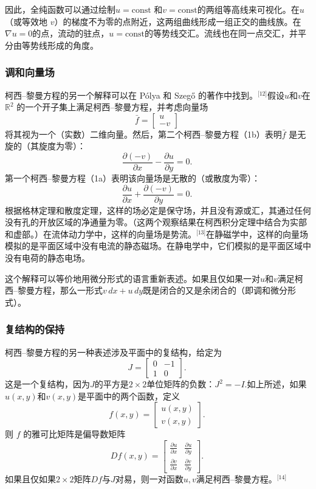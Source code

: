 因此，全纯函数可以通过绘制\( u = \text{const} \) 和\( v = \text{const} \)的两组等高线来可视化。在\( u \)（或等效地 \( v \)）的梯度不为零的点附近，这两组曲线形成一组正交的曲线族。在\( \nabla u = 0 \)的点，流动的驻点，\( u = \text{const} \)的等势线交汇。流线也在同一点交汇，并平分由等势线形成的角度。
\subsubsection{调和向量场}
柯西–黎曼方程的另一个解释可以在 Pólya 和 Szegő 的著作中找到。\(^\text{[12]}\)假设\( u \)和\( v \)在\(\mathbb{R}^2 \) 的一个开子集上满足柯西–黎曼方程，并考虑向量场  
\[
\bar{f} = \begin{bmatrix} u \\ -v \end{bmatrix}~
\]
将其视为一个（实数）二维向量。然后，第二个柯西–黎曼方程（1b）表明\( \bar{f} \) 是无旋的（其旋度为零）：  
\[
\frac{\partial (-v)}{\partial x} - \frac{\partial u}{\partial y} = 0.~
\]
第一个柯西–黎曼方程（1a）表明该向量场是无散的（或散度为零）：  
\[
\frac{\partial u}{\partial x} + \frac{\partial (-v)}{\partial y} = 0.~
\]
根据格林定理和散度定理，这样的场必定是保守场，并且没有源或汇，其通过任何没有孔的开放区域的净通量为零。（这两个观察结果在柯西积分定理中结合为实部和虚部。）在流体动力学中，这样的向量场是势流。\(^\text{[13]}\)在静磁学中，这样的向量场模拟的是平面区域中没有电流的静态磁场。在静电学中，它们模拟的是平面区域中没有电荷的静态电场。

这个解释可以等价地用微分形式的语言重新表述。如果且仅如果一对\( u \)和\( v \)满足柯西–黎曼方程，那么一形式\(v\,dx + u\,dy\)既是闭合的又是余闭合的（即调和微分形式）。
\subsubsection{复结构的保持}  
柯西–黎曼方程的另一种表述涉及平面中的复结构，给定为  
\[
J = \begin{bmatrix} 0 & -1 \\ 1 & 0 \end{bmatrix}.~
\]  
这是一个复结构，因为\( J \)的平方是\(2\times2\)单位矩阵的负数：\(J^2 = -I\).如上所述，如果\( u(x, y) \)和\( v(x, y) \)是平面中的两个函数，定义  
\[
f(x, y) = \begin{bmatrix} u(x, y) \\ v(x, y) \end{bmatrix}.~
\]
则 \( f \) 的雅可比矩阵是偏导数矩阵  
\[
D f(x, y) = \begin{bmatrix} \frac{\partial u}{\partial x} & \frac{\partial u}{\partial y} \\ \frac{\partial v}{\partial x} & \frac{\partial v}{\partial y} \end{bmatrix}.~
\]
如果且仅如果\(2\times2\)矩阵\( Df \)与\( J \)对易，则一对函数\( u, v \)满足柯西–黎曼方程。\(^\text{[14]}\)


